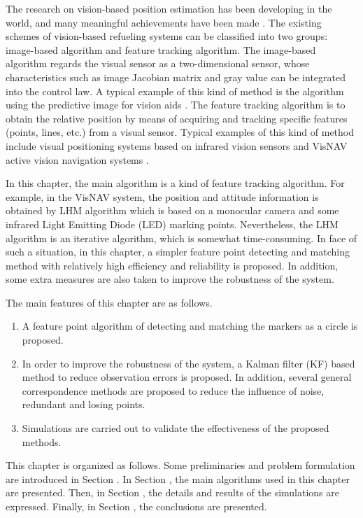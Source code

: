 The research on vision-based position estimation has been developing in the
world, and many meaningful achievements have been made \cite%
{Kimm,Weaver,Xie}. The existing schemes of vision-based refueling
systems can be classified into two groups: image-based algorithm and feature
tracking algorithm. The image-based algorithm regards the visual sensor
as a two-dimensional sensor, whose characteristics such as image Jacobian
matrix and gray value can be integrated into the control law. A typical
example of this kind of method is the algorithm using the predictive
image for vision aids \cite{Weaver}. The feature tracking
algorithm is to obtain the relative position by means of acquiring and
tracking specific features (points, lines, etc.) from a visual sensor. Typical examples of this kind of method include visual positioning systems based on infrared vision sensors \cite{chen} and VisNAV active vision
navigation systems \cite{Vala,Tan}.

In this chapter, the main algorithm is a kind of feature tracking algorithm.
For example, in the VisNAV system, the position and attitude
information is obtained by LHM \cite{Lu} algorithm which is based on a
monocular camera and some infrared Light Emitting Diode (LED) marking points. Nevertheless, the LHM
algorithm is an iterative algorithm, which is somewhat time-consuming. In face of such a situation, in this
chapter, a simpler feature point detecting and matching method with relatively
high efficiency and reliability is proposed. In addition, some extra
measures are also taken to improve the robustness of the system.

The main features of this chapter are as follows.

\begin{enumerate}[1)]
	\item A feature point algorithm of detecting and matching the markers as a circle is proposed.
	\item In order to improve the robustness of the system, a Kalman filter (KF) based method to reduce observation errors is proposed. In addition, several general correspondence methods are proposed to reduce the influence of noise, redundant and losing points.
	\item Simulations are carried out to validate the effectiveness of the proposed methods.
\end{enumerate}

This chapter is organized as follows. Some preliminaries and problem formulation are introduced in Section \uppercase\expandafter{}. In Section \uppercase\expandafter{}, the main algorithms used in this chapter are presented. Then, in Section \uppercase\expandafter{}, the details and results of the simulations are expressed. Finally, in Section \uppercase\expandafter{}, the conclusions are presented.

